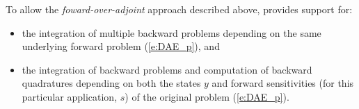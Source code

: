 \bigskip

To allow the {\em foward-over-adjoint} approach described above, {\idas} provides support for:
\begin{itemize}
\item the integration of multiple backward problems depending on the same
  underlying forward problem (\ref{e:DAE_p}), and
\item the integration of backward problems and computation of backward quadratures
  depending on both the states $y$ and forward sensitivities (for this particular 
  application, $s$) of the original problem (\ref{e:DAE_p}).
\end{itemize}
